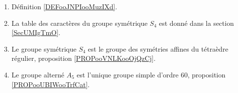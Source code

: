        \label{THEMEooQEEWooXDhvhv}

\begin{enumerate}
    \item
        Définition \ref{DEFooJNPIooMuzIXd}.
    \item
        La table des caractères du groupe symétrique \( S_4\) est donné dans la section \ref{SecUMIgTmO}.
    \item
        Le groupe symétrique \( S_4\) est le groupe des symétries affines du tétraèdre régulier, proposition \ref{PROPooVNLKooOjQzCj}.
    \item
        Le groupe alterné \( A_5\) est l'unique groupe simple d'ordre \( 60\), proposition \ref{PROPooUBIWooTrfCat}.
\end{enumerate}
